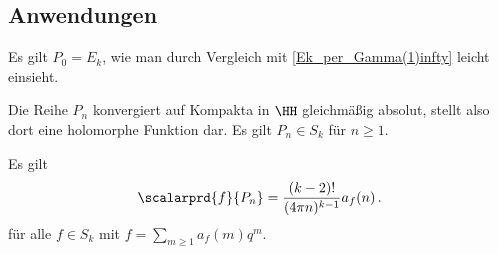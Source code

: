 \subsection{Anwendungen}

\begin{beme}
Es gilt $P_0 = E_k$, wie man durch Vergleich mit \ref{Ek_per_Gamma(1)infty} leicht einsieht.
\end{beme}

\begin{satz-list}\label{<f,Pn>}
\item Die Reihe $P_n$ konvergiert auf Kompakta in $\HH$ gleichmäßig absolut, stellt also dort eine holomorphe Funktion dar. Es gilt $P_n \in S_k$ für $n \geq 1$.
\item Es gilt 
\[
	\scalarprd {f}{P_n} = \frac{(k-2)!}{(4\pi n)^{k-1}} a_f(n)
	\,.
\]
für alle $f \in S_k$ mit $f = \sum_{m\geq 1} a_f(m) q^m$.
\end{satz-list}

